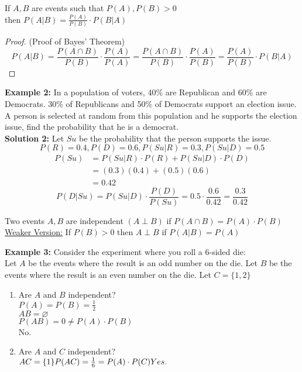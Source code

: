\documentclass[12pt, twoside]{article}
\begin{document}
\begin{tcolorbox}[title = Theorem: Bayes' Theorem]
	If $A,B$ are events such that $P(A), P(B) > 0$\\
	then $P(A | B) = \frac{P(A)}{P(B)} \cdot P(B | A)$
\end{tcolorbox}

\begin{proof}
	(Proof of Bayes' Theorem)\\
	$$P(A | B) = \frac{P(A \cap B)}{P(B)}\cdot \frac{P(A)}{P(A)} = \frac{P(A \cap B)}{P(B)}\cdot \frac{P(A)}{P(B)} = \frac{P(A)}{P(B)} \cdot P(B | A)$$
\end{proof}

\textbf{Example 2:} In a population of voters, 40\% are Republican and 60\% are Democrats. 30\% of Republicans and 50\% of Democrats support an election issue. A person is selected at random from this population and he supports the election issue, find the probability that he is a democrat.\\

\textbf{Solution 2:} Let $Su$ be the probability that the person supports the issue.
$$P(R) = 0.4, P(D) = 0.6, P(Su | R) = 0.3, P(Su | D) = 0.5$$
\begin{align*}
	P(Su) &= P(Su | R) \cdot P(R) + P(Su | D) \cdot P(D)\\
	&= (0.3)(0.4) + (0.5)(0.6)\\
	&= 0.42
\end{align*}
$$P(D | Su) = P(Su | D) \cdot \frac{P(D)}{P(Su)} = 0.5 \cdot \frac{0.6}{0.42} = \frac{0.3}{0.42}$$

\begin{tcolorbox}[title= Definition: Independent Events]
	Two events $A,B$ are independent $(A \perp B)$ if $P(A \cap B) = P(A) \cdot P(B)$\\
	\underline{Weaker Version:} If $P(B) > 0$ then $A \perp B$ if $P(A | B) = P(A)$
\end{tcolorbox}

\textbf{Example 3:} Consider the experiment where you roll a 6-sided die:\\
Let $A$ be the events where the result is an odd number on the die. Let $B$ be the events where the result is an even number on the die. Let $C = \{ 1,2 \}$
\begin{enumerate}
	\item{Are $A$ and $B$ independent?\\
	$P(A) = P(B) = \frac{1}{2}$\\
	$AB = \varnothing$\\
	$P(AB) = 0 \neq P(A) \cdot P(B)$\\
	No.}
	\item{Are $A$ and $C$ independent?\\
	$AC = \{ 1 \}\\
	P(AC) = \frac{1}{6} = P(A) \cdot P(C)\\
	Yes.$}
\end{enumerate}
\end{document}
